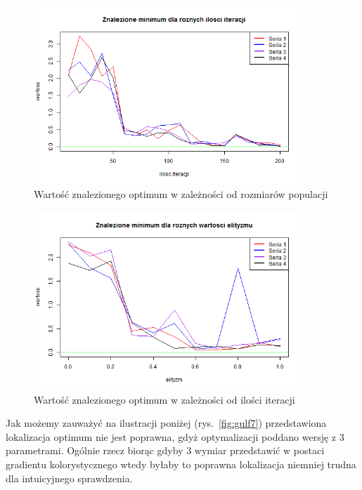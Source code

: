 \documentclass[11pt, a4paper]{article}
\newcommand{\fbi}{\leavevmode{\parindent=1em\indent}}
\begin{document}
\begin{figure}[H]
	\begin{center}
		\includegraphics[width=0.9\textwidth]{./assets/Gulf5.png} %
		\caption{Wartość znalezionego optimum w zależności od rozmiarów populacji}
		\label{fig:gulf5}
	\end{center}
\end{figure}

\begin{figure}[H]
	\begin{center}
		\includegraphics[width=0.9\textwidth]{./assets/Gulf6.png} %
		\caption{Wartość znalezionego optimum w zależności od ilości iteracji}
		\label{fig:gulf6}
	\end{center}
\end{figure}

\fbi
Jak możemy zauważyć na ilustracji poniżej (rys.~\ref{fig:gulf7}) przedstawiona lokalizacja optimum nie jest poprawna, gdyż optymalizacji poddano wersję z 3 parametrami. Ogólnie rzecz biorąc gdyby 3 wymiar przedstawić w postaci gradientu kolorystycznego wtedy byłaby to poprawna lokalizacja niemniej trudna dla intuicyjnego sprawdzenia.
\end{document}
